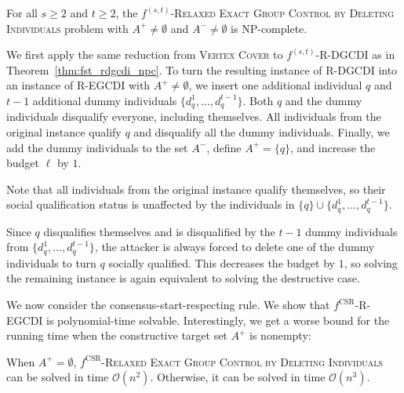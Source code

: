 \documentclass[
    12pt,               %
    a4paper,            %
    bibtotoc,           %
    pointlessnumbers,   %
    ngerman,            %
    titlepage,          %
    leqno,              %
    ]{scrarticle}       %
\newcommand\thmref{Theorem~\ref}
\begin{document}
\begin{Theorem} \label{thm:fst_regcdi_npc}
For all $s \geq 2$ and $t \geq 2$, the $f^{(s, t)}$-\textsc{Relaxed Exact Group Control by Deleting Individuals} problem with $A^+ \neq \emptyset$ and $A^- \neq \emptyset$ is NP-complete.
\end{Theorem}

\begin{Proof}
We first apply the same reduction from \textsc{Vertex Cover} to $f^{(s, t)}$-R-DGCDI as in \thmref{thm:fst_rdgcdi_npc}. To turn the resulting instance of R-DGCDI into an instance of R-EGCDI with $A^+ \neq \emptyset$, we insert one additional individual $q$ and $t-1$ additional dummy individuals $\{ d_q^1, \ldots, d_q^{t-1} \}$. Both $q$ and the dummy individuals disqualify everyone, including themselves. All individuals from the original instance qualify $q$ and disqualify all the dummy individuals. Finally, we add the dummy individuals to the set $A^-$, define $A^+ = \{q\}$, and increase the budget $\ell$ by $1$.

Note that all individuals from the original instance qualify themselves, so their social qualification status is unaffected by the individuals in $\{q\} \cup \{ d_q^1, \ldots, d_q^{t-1} \}$.

Since $q$ disqualifies themselves and is disqualified by the $t-1$ dummy individuals from $\{ d_q^1, \ldots, d_q^{t-1} \}$, the attacker is always forced to delete one of the dummy individuals to turn $q$ socially qualified. This decreases the budget by $1$, so solving the remaining instance is again equivalent to solving the destructive case.
\end{Proof}



We now consider the consensus-start-respecting rule. We show that $f^{\text{CSR}}$-R-EGCDI is polynomial-time solvable. Interestingly, we get a worse bound for the running time when the constructive target set $A^+$ is nonempty:

\begin{Theorem} \label{thm:csr_regcdi_p}
When $A^+ = \emptyset$, $f^{\text{CSR}}$-\textsc{Relaxed Exact Group Control by Deleting Individuals} can be solved in time $\mathcal{O}(n^2)$. Otherwise, it can be solved in time $\mathcal{O}(n^3)$.
\end{Theorem}
\end{document}
